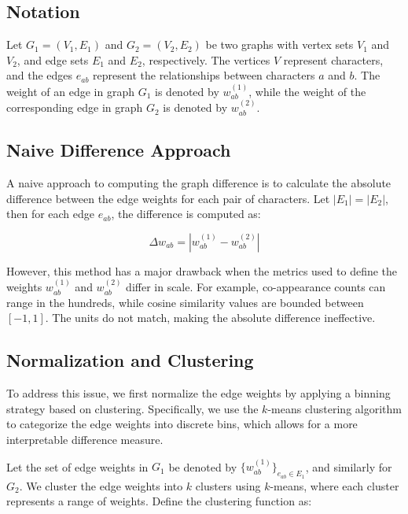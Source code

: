 \documentclass[a4paper,12pt]{report}
\begin{document}
\subsection{Notation}

Let \( G_1 = (V_1, E_1) \) and \( G_2 = (V_2, E_2) \) be two graphs with vertex sets \( V_1 \) and \( V_2 \), and edge sets \( E_1 \) and \( E_2 \), respectively. The vertices \( V \) represent characters, and the edges \( e_{ab} \) represent the relationships between characters \( a \) and \( b \). The weight of an edge in graph \( G_1 \) is denoted by \( w_{ab}^{(1)} \), while the weight of the corresponding edge in graph \( G_2 \) is denoted by \( w_{ab}^{(2)} \).

\subsection{Naive Difference Approach}

A naive approach to computing the graph difference is to calculate the absolute difference between the edge weights for each pair of characters. Let \( |E_1| = |E_2| \), then for each edge \( e_{ab} \), the difference is computed as:

\begin{equation}
    \Delta w_{ab} = | w_{ab}^{(1)} - w_{ab}^{(2)} |
\end{equation}

However, this method has a major drawback when the metrics used to define the weights \( w_{ab}^{(1)} \) and \( w_{ab}^{(2)} \) differ in scale. For example, co-appearance counts can range in the hundreds, while cosine similarity values are bounded between \([-1, 1]\). The units do not match, making the absolute difference ineffective.

\subsection{Normalization and Clustering}

To address this issue, we first normalize the edge weights by applying a binning strategy based on clustering. Specifically, we use the \( k \)-means clustering algorithm to categorize the edge weights into discrete bins, which allows for a more interpretable difference measure.

Let the set of edge weights in \( G_1 \) be denoted by \( \{w_{ab}^{(1)}\}_{e_{ab} \in E_1} \), and similarly for \( G_2 \). We cluster the edge weights into \( k \) clusters using \( k \)-means, where each cluster represents a range of weights. Define the clustering function as:
\end{document}
